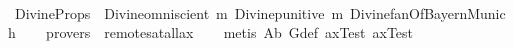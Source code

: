 \begin{isabellebody}
\begin{isamarkuptext}
\end{isamarkuptext}%
\isamarkuptrue%
\ \ \isamarkupfalse%
\ DivineProps\ {\isacharcolon}\ {\isachardoublequoteopen}{\isacharbrackleft}Divine{\isacharparenleft}omniscient{\isacharparenright}\ m{\isasymand}\ Divine{\isacharparenleft}punitive{\isacharparenright}\ m{\isasymand}\ Divine{\isacharparenleft}fanOfBayernMunich{\isacharparenright}{\isacharbrackright}{\isachardoublequoteclose}\isanewline
\ \ \isamarkupfalse%
\ {\isacharbrackleft}provers\ {\isacharequal}\ remote{\isacharunderscore}satallax{\isacharbrackright}\isanewline
%
\isadelimproof
\ \ %
\endisadelimproof
%
\isatagproof
{}\isamarkupfalse%
\ {\isacharparenleft}metis\ A{}b\ G{\isacharunderscore}def\ axTest{}\ axTest{}{\isacharparenright}%
\endisatagproof
{\isafoldproof}%
%
\isadelimproof
%
\endisadelimproof
%
\begin{isamarkuptext}%
\newpage%
\end{isamarkuptext}%
\isamarkuptrue%
%
\isadelimtheory
%
\endisadelimtheory
%
\isatagtheory
%
\endisatagtheory
{\isafoldtheory}%
%
\isadelimtheory
%
\endisadelimtheory
\ \end{isabellebody}%
